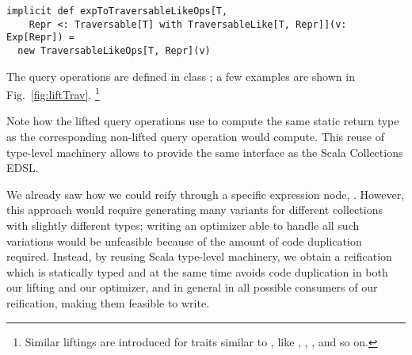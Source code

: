 \begin{lstlisting}
implicit def expToTraversableLikeOps[T,
    Repr <: Traversable[T] with TraversableLike[T, Repr]](v: Exp[Repr]) =
  new TraversableLikeOps[T, Repr](v)
\end{lstlisting}

The query operations are defined in class ; a few examples are shown in Fig.~\ref{fig:liftTrav}.%
\footnote{Similar liftings are introduced for traits similar to , like , , , and so on.}

Note how the lifted query operations use  to compute the same static return type as the corresponding non-lifted query operation would compute. This reuse of type-level machinery allows {\LoS} to provide the same interface as the Scala Collections EDSL\@.

We already saw how we could reify  through a specific expression node, . However, this approach would require generating many variants for different collections with slightly different types; writing an optimizer able to handle all such variations would be unfeasible because of the amount of code duplication required.
Instead, by reusing Scala type-level machinery, we obtain a reification which is statically typed and at the same time avoids code duplication in both our lifting and our optimizer, and in general in all possible consumers of our reification, making them feasible to write.



